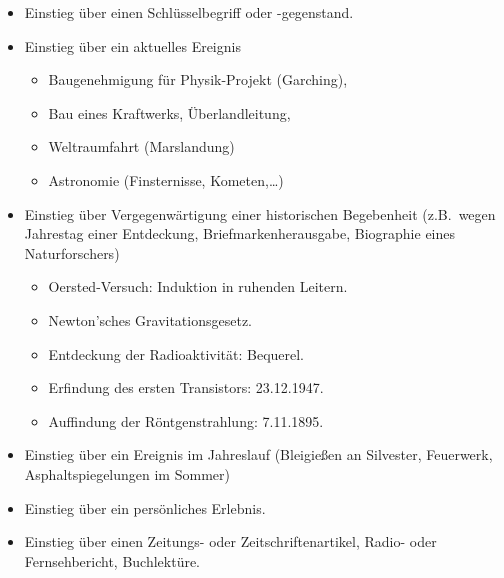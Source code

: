 \begin{itemize}
	\item
	Einstieg \"{u}ber einen Schl\"{u}sselbegriff oder -gegenstand.
	
	\item
	Einstieg \"{u}ber ein aktuelles Ereignis
	\begin{itemize}
	\item
	Baugenehmigung f\"{u}r Physik-Projekt (Garching),
	\item
	Bau eines Kraftwerks, \"{U}berlandleitung,
	\item
	Weltraumfahrt (Marslandung)
	\item
	Astronomie (Finsternisse, Kometen,\dots)
	\end{itemize}
	
	\item
	Einstieg \"{u}ber Vergegenw\"{a}rtigung einer historischen Begebenheit
	(z.B.\ wegen Jahrestag einer Entdeckung, Briefmarkenherausgabe,
	Biographie eines Naturforschers)
	\begin{itemize}
	\item
	Oersted-Versuch: Induktion in ruhenden Leitern.
	\item
	Newton'sches Gravitationsgesetz.
	\item
	Entdeckung der Radioaktivit\"{a}t: Bequerel.
	\item
	Erfindung des ersten Transistors: 23.12.1947.
	\item
	Auffindung der R\"{o}ntgenstrahlung: 7.11.1895.
	\end{itemize}
	
	\item
	Einstieg \"{u}ber ein Ereignis im Jahreslauf
	(Bleigie{\ss}en an Silvester, Feuerwerk, Asphaltspiegelungen im Sommer)
	
	\item
	Einstieg \"{u}ber ein pers\"{o}nliches Erlebnis.
	
	\item
	Einstieg \"{u}ber einen Zeitungs- oder Zeitschriftenartikel, Radio- oder Fernsehbericht, Buchlekt\"{u}re.

\end{itemize}

